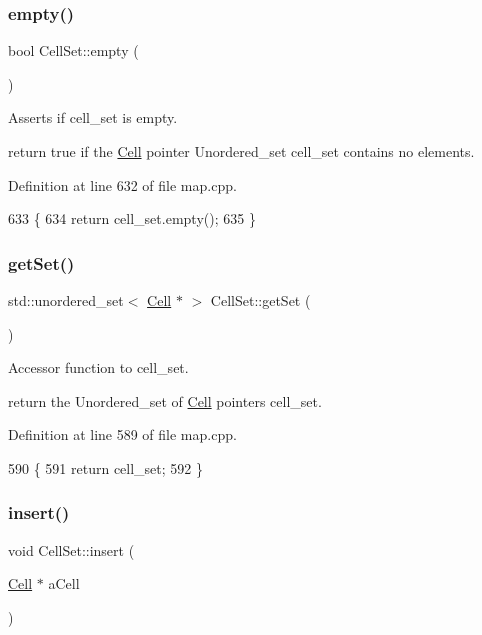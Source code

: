 \subsubsection{\texorpdfstring{empty()}{empty()}}
{\footnotesize\ttfamily bool Cell\+Set\+::empty (\begin{DoxyParamCaption}{ }\end{DoxyParamCaption})}



Asserts if cell\+\_\+set is empty. 

return true if the \hyperlink{class_cell}{Cell} pointer Unordered\+\_\+set cell\+\_\+set contains no elements. 

Definition at line 632 of file map.\+cpp.


\begin{DoxyCode}
633 \{
634     \textcolor{keywordflow}{return} cell\_set.empty();
635 \}
\end{DoxyCode}
\hypertarget{class_cell_set_a16ffb9da795fb77b5214ff0ad276c325}{}\label{class_cell_set_a16ffb9da795fb77b5214ff0ad276c325} 
\subsubsection{\texorpdfstring{get\+Set()}{getSet()}}
{\footnotesize\ttfamily std\+::unordered\+\_\+set$<$ \hyperlink{class_cell}{Cell} $\ast$ $>$ Cell\+Set\+::get\+Set (\begin{DoxyParamCaption}{ }\end{DoxyParamCaption})}



Accessor function to cell\+\_\+set. 

return the Unordered\+\_\+set of \hyperlink{class_cell}{Cell} pointers cell\+\_\+set. 

Definition at line 589 of file map.\+cpp.


\begin{DoxyCode}
590 \{
591     \textcolor{keywordflow}{return} cell\_set;
592 \}
\end{DoxyCode}
\hypertarget{class_cell_set_a589f95793822a6c76b45ab3c5cadeda3}{}\label{class_cell_set_a589f95793822a6c76b45ab3c5cadeda3} 
\subsubsection{\texorpdfstring{insert()}{insert()}}
{\footnotesize\ttfamily void Cell\+Set\+::insert (\begin{DoxyParamCaption}\item[{\hyperlink{class_cell}{Cell} $\ast$}]{a\+Cell }\end{DoxyParamCaption})}



